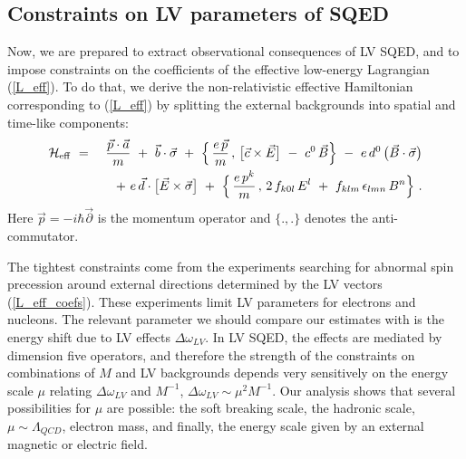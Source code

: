\documentclass[12pt]{revtex4}
\begin{document}
\subsection{Constraints on LV parameters of SQED}


Now, we are prepared to extract observational consequences of LV SQED,
and to impose constraints on the coefficients of the effective low-energy
Lagrangian (\ref{L_eff}). To do that, we derive the non-relativistic
effective Hamiltonian corresponding to (\ref{L_eff}) by splitting the
external backgrounds into spatial and  time-like components: 
\begin{eqnarray}
        \mathcal{H}_{\rm eff} 
        & ~=~ &
        \frac{\vec{p} \cdot \vec{a}}
                  {m}
        ~+~
        \vec{b} \cdot \vec{\sigma}
        ~+~
        \Big\{\, 
                \frac{e\, \vec{p}}
                    {m}
                \, ,\, 
                \big[ \vec{c} \times \vec{E} \big]
                ~-~
                c^0\, \vec{B} 
        \Big\}
        ~-~ 
        e \, d^0 \, \big( \vec{B} \cdot \vec{\sigma} \big)
\nonumber        \\
\label{H_eff}
        & &
        ~+~
        e\, \vec{d} \cdot
        \big[ \vec{E} \times \vec{\sigma} \big]
        ~+~
        \Big\{\, 
                \frac{e\, p^k}
                    {m}
                \,,\, 
                2\, f_{k0l}\, E^l 
                ~+~
                f_{klm} \,\epsilon_{lmn}\, 
                B^n
        \Big\}~. 
\end{eqnarray}
%
Here $ \vec{p} = - i \hbar \vec{\partial} $ is the momentum operator
and $\{.,.\}$ denotes the anti-commutator. 


The tightest constraints come from the experiments searching for 
abnormal spin precession around external directions determined by the
LV vectors (\ref{L_eff_coefs}). These experiments limit LV parameters 
for electrons and nucleons. The relevant parameter we should compare 
our estimates with is the energy shift due to LV effects 
$\Delta \omega_{LV}$. In LV SQED, the effects are mediated by
dimension five operators, and therefore the strength of the
constraints on combinations of $M$ and LV backgrounds depends very
sensitively on the energy scale $\mu$ relating $\Delta \omega_{LV}$
and $M^{-1}$, $\Delta \omega_{LV} \sim \mu^2 M^{-1}$. Our analysis
shows that several possibilities for $\mu$ are possible: the soft
breaking scale, the hadronic scale, $\mu \sim \Lambda_{QCD}$, electron
mass, and finally, the energy scale given by an external magnetic or
electric field. 
\end{document}
